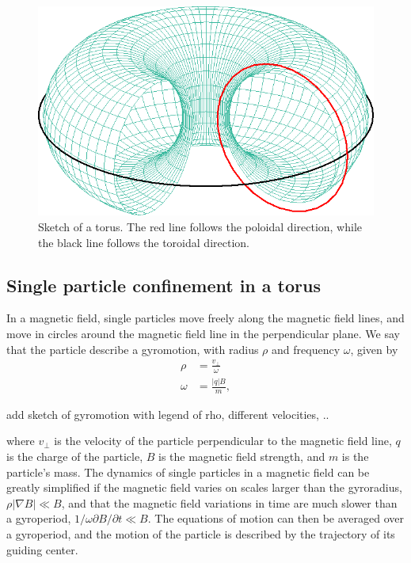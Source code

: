 \documentclass[my_thesis.tex]{subfiles}
\begin{document}
\begin{figure}
    \centering
    \includegraphics[width=.75\linewidth]{images/torus.png}
    \caption{Sketch of a torus. The red line follows the poloidal direction, while the black line follows the toroidal direction.}
    \label{fig.torus}
\end{figure}

\subsection{Single particle confinement in a torus}
In a magnetic field, single particles move freely along the magnetic field lines, and move in circles around the magnetic field line in the perpendicular plane. We say that the particle describe a gyromotion, with radius $\rho$ and frequency $\omega$, given by
\begin{align}
    \rho &= \frac{v_\perp}{\omega}\\
    \omega &= \frac{|q|B}{m},
\end{align}

{\color{red} add sketch of gyromotion with legend of rho, different velocities, ..}

where $v_\perp$ is the velocity of the particle perpendicular to the magnetic field line, $q$ is the charge of the particle, $B$ is the magnetic field strength, and $m$ is the particle's mass. The dynamics of single particles in a magnetic field can be greatly simplified if the magnetic field varies on scales larger than the gyroradius, $\rho|\nabla B|\ll B$, and that the magnetic field variations in time are much slower than a gyroperiod, $1/\omega \partial B/\partial t \ll B$. The equations of motion can then be averaged over a gyroperiod, and the motion of the particle is described by the trajectory of its guiding center.
\end{document}
